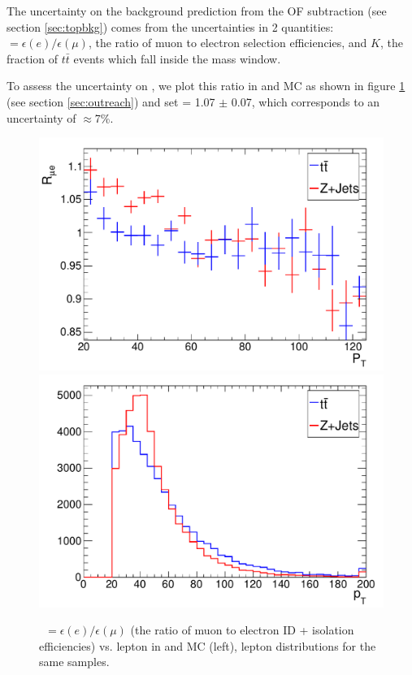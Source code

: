 The uncertainty on the background prediction from the OF subtraction (see section \ref{sec:topbkg}) 
comes from the uncertainties in 2
quantities: \effr$ = \epsilon(e)/\epsilon(\mu)$, the ratio of muon to electron selection 
efficiencies,
and $K$, the fraction of $t\bar{t}$ events which fall inside the \Z mass window.

To assess the uncertainty on \effr, we plot this ratio in \ttbar and \Z MC
as shown in figure \ref{fig:rvspt} 
(see section \ref{sec:outreach}) and set \effr = 1.07 $\pm$ 0.07, which corresponds to
an uncertainty of $\approx$7\%.

\begin{figure}[tbh]
  \begin{center}
	\includegraphics[width=0.48\linewidth]{plots/reff_vpt_zjm.pdf}
	\includegraphics[width=0.48\linewidth]{plots/ptcompare_ztt.pdf}
	\caption{
	  \label{fig:rvspt}\protect 
	  \effr~$ = \epsilon(e)/\epsilon(\mu)$ 
	  (the ratio of muon to electron ID + isolation efficiencies) 
	  vs. lepton \pt in \Z and \ttbar MC (left),
	  lepton \pt distributions for the same samples.
	}
  \end{center}
\end{figure}


%
%

